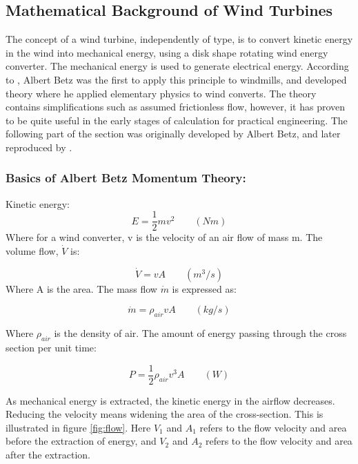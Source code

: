 \subsection{Mathematical Background of Wind Turbines}
The concept of a wind turbine, independently of type, is to convert kinetic energy in the wind into mechanical energy, using a disk shape rotating wind energy converter. The mechanical energy is used to generate electrical energy.  According to \cite{Hau2013},  Albert Betz was the first to apply this principle to windmills, and developed theory where he applied elementary physics to wind converts. The theory contains simplifications such as assumed frictionless flow, however, it has proven to be quite useful in the early stages of calculation for practical engineering. The following part of the section was originally developed by Albert Betz, and later reproduced by \cite{Hau2013}.

\subsubsection{Basics of Albert Betz Momentum Theory:}
\noindent Kinetic energy:
\begin{equation}
    E=\frac{1}{2} m v^2 \qquad (Nm)
\end{equation}
 Where for a wind converter, v is the velocity of an air flow of mass m. The volume flow, $\dot V$ is:
 
 \begin{equation}
    \dot V= v A \qquad (m^3/s)
\end{equation}
Where A is the area. The mass flow $\dot m$ is expressed as:

 \begin{equation}
    \dot m = \rho_{air} v A \qquad (kg/s)
\end{equation}

\noindent Where $\rho_{air}$ is the density of air. The amount of energy passing through the cross section per unit time:

 \begin{equation}
    P = \frac{1}{2}\rho_{air} v^3 A \qquad (W)
\end{equation}

\noindent As mechanical energy is extracted, the kinetic energy in the airflow decreases. Reducing the velocity means widening the area of the cross-section. This is illustrated in figure \ref{fig:flow}. Here $V_1$ and  $A_1$ refers to the flow velocity and area before the extraction of energy, and $V_2$ and $A_2$ refers to the flow velocity and area after the extraction.

